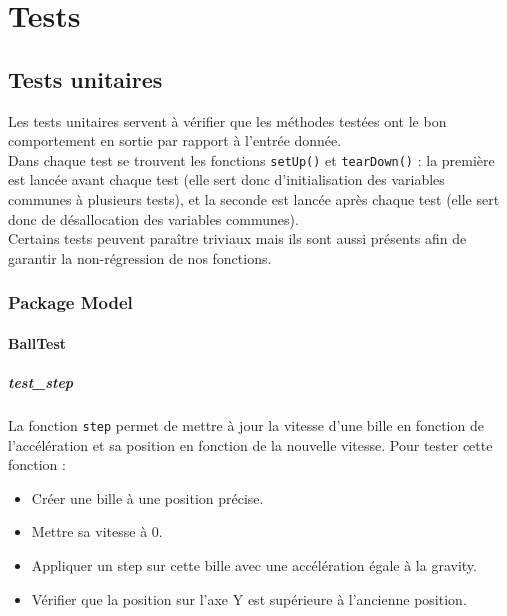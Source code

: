 \documentclass{report}
\begin{document}
\chapter{Tests}

\section{Tests unitaires}

Les tests unitaires servent à vérifier que les méthodes testées ont le bon comportement en sortie par rapport à l’entrée donnée. \\

Dans chaque test se trouvent les fonctions \texttt{setUp()} et \texttt{tearDown()} : la première est lancée avant chaque test (elle sert donc d’initialisation des variables communes à plusieurs tests), et la seconde est lancée après chaque test (elle sert donc de désallocation des variables communes). \\

Certains tests peuvent paraître triviaux mais ils sont aussi présents afin de garantir la non-régression de nos fonctions.

\subsection{Package Model}

\subsubsection{BallTest}

\paragraph{test\_step}

La fonction \texttt{step} permet de mettre à jour la vitesse d’une bille en fonction de l’accélération et sa position en fonction de la nouvelle vitesse. Pour tester cette fonction : 
\begin{itemize}
\item Créer une bille à une position précise.
\item Mettre sa vitesse à 0.
\item Appliquer un step sur cette bille avec une accélération égale à la gravity.
\item Vérifier que la position sur l’axe Y est supérieure à  l'ancienne position.
\end{itemize}
\end{document}
